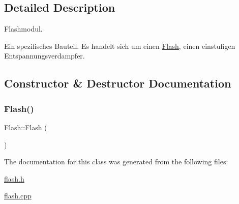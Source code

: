 \subsection{Detailed Description}
Flashmodul. 

Ein spezifisches Bauteil. Es handelt sich um einen \mbox{\hyperlink{class_flash}{Flash}}, einen einstufigen Entspannungsverdampfer. 

\subsection{Constructor \& Destructor Documentation}
\mbox{\label{class_flash_a67aac213fb3576b2a3ae1d5862f99812}} 
\subsubsection{\texorpdfstring{Flash()}{Flash()}}
{\footnotesize\ttfamily Flash\+::\+Flash (\begin{DoxyParamCaption}{ }\end{DoxyParamCaption})}



The documentation for this class was generated from the following files\+:\begin{DoxyCompactItemize}
\item 
\mbox{\hyperlink{flash_8h}{flash.\+h}}\item 
\mbox{\hyperlink{flash_8cpp}{flash.\+cpp}}\end{DoxyCompactItemize}
